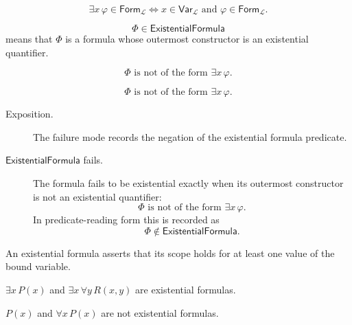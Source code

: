 \begin{remark*}
\[
\exists x\,\varphi\in\mathsf{Form}_{\mathcal L}
\Longleftrightarrow
x\in\mathsf{Var}_{\mathcal L}
\text{ and }
\varphi\in\mathsf{Form}_{\mathcal L}.
\]
\end{remark*}

\begin{remark*}
\[
  \Phi\in\mathsf{ExistentialFormula}
\] means that \(\Phi\) is a formula
whose outermost constructor is an existential quantifier.
\end{remark*}

\begin{remark*}
\[
\Phi \text{ is not of the form } \exists x\,\varphi.
\]
\end{remark*}

\begin{remark*}
\[
  \Phi \text{ is not of the form } \exists x\,\varphi.
\]
\end{remark*}

\begin{remark*}
\begin{description}
  \item[Exposition.] The failure mode records the negation of the existential
  formula predicate.
  \item[\(\mathsf{ExistentialFormula}\) fails.] The formula fails to be
  existential exactly when its outermost constructor is not an existential
  quantifier:
  \[
  \Phi \text{ is not of the form } \exists x\,\varphi.
  \]
  In predicate-reading form this is recorded as
  \[
  \Phi\notin\mathsf{ExistentialFormula}.
  \]
\end{description}
\end{remark*}

\begin{remark*}[Interpretation]
An existential formula asserts that its scope holds for at least one value of
the bound variable.
\end{remark*}

\begin{remark*}[Examples]
\(\exists x\,P(x)\) and \(\exists x\,\forall y\,R(x,y)\) are existential
formulas.
\end{remark*}

\begin{remark*}
\(P(x)\) and \(\forall x\,P(x)\) are not existential formulas.
\end{remark*}


